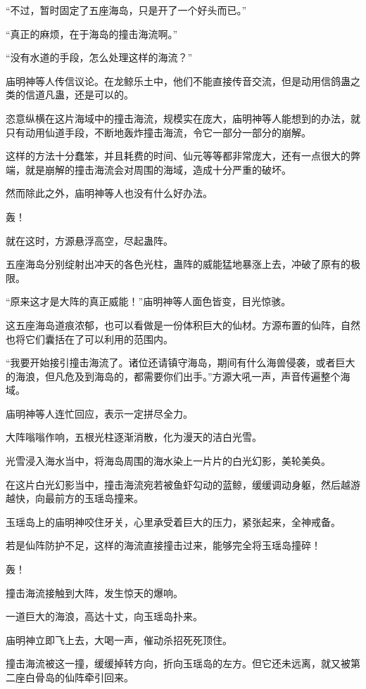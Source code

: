 \begin{this_body}
“不过，暂时固定了五座海岛，只是开了一个好头而已。”

“真正的麻烦，在于海岛的撞击海流啊。”

“没有水道的手段，怎么处理这样的海流？”

庙明神等人传信议论。在龙鲸乐土中，他们不能直接传音交流，但是动用信鸽蛊之类的信道凡蛊，还是可以的。

恣意纵横在这片海域中的撞击海流，规模实在庞大，庙明神等人能想到的办法，就只有动用仙道手段，不断地轰炸撞击海流，令它一部分一部分的崩解。

这样的方法十分蠢笨，并且耗费的时间、仙元等等都非常庞大，还有一点很大的弊端，就是崩解的撞击海流会对周围的海域，造成十分严重的破坏。

然而除此之外，庙明神等人也没有什么好办法。

轰！

就在这时，方源悬浮高空，尽起蛊阵。

五座海岛分别绽射出冲天的各色光柱，蛊阵的威能猛地暴涨上去，冲破了原有的极限。

“原来这才是大阵的真正威能！”庙明神等人面色皆变，目光惊骇。

这五座海岛道痕浓郁，也可以看做是一份体积巨大的仙材。方源布置的仙阵，自然也将它们囊括在了可以利用的范围内。

“我要开始接引撞击海流了。诸位还请镇守海岛，期间有什么海兽侵袭，或者巨大的海浪，但凡危及到海岛的，都需要你们出手。”方源大吼一声，声音传遍整个海域。

庙明神等人连忙回应，表示一定拼尽全力。

大阵嗡嗡作响，五根光柱逐渐消散，化为漫天的洁白光雪。

光雪浸入海水当中，将海岛周围的海水染上一片片的白光幻影，美轮美奂。

在这片白光幻影当中，撞击海流宛若被鱼虾勾动的蓝鲸，缓缓调动身躯，然后越游越快，向最前方的玉瑶岛撞来。

玉瑶岛上的庙明神咬住牙关，心里承受着巨大的压力，紧张起来，全神戒备。

若是仙阵防护不足，这样的海流直接撞击过来，能够完全将玉瑶岛撞碎！

轰！

撞击海流接触到大阵，发生惊天的爆响。

一道巨大的海浪，高达十丈，向玉瑶岛扑来。

庙明神立即飞上去，大喝一声，催动杀招死死顶住。

撞击海流被这一撞，缓缓掉转方向，折向玉瑶岛的左方。但它还未远离，就又被第二座白骨岛的仙阵牵引回来。


\end{this_body}
